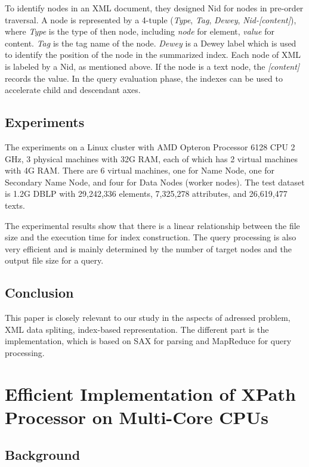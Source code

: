 \documentclass{paper}
\begin{document}
	To identify nodes in an XML document, 
	they designed Nid for nodes in pre-order traversal. A node is
	represented by a 4-tuple  (\emph{Type}, \emph{Tag}, \emph{Dewey}, 
	\emph{Nid-[content]}), where \emph{Type} is the type of then node, 
	including \emph{node} for element, 	\emph{value} for
	content. \emph{Tag} is the tag name of the node. \emph{Dewey} is a Dewey 
	label which is used to identify the position of the  node in the summarized
	index. Each node of XML is labeled by a Nid, as mentioned above.  If
	the node is a text node, the \emph{[content]} records the value. 
	In the query evaluation phase, the indexes can be used to accelerate 
	child and descendant axes.
	
	
	\subsection{Experiments} 
	
	The experiments on a Linux cluster with AMD Opteron Processor 6128 CPU
	2 GHz, 3 physical machines with 32G RAM, each of which has 2 virtual
	machines with 4G RAM. There are 6 virtual machines, one for Name Node,
	one for Secondary Name Node, and four for Data Nodes (worker nodes).
	The test dataset is 1.2G DBLP with 29,242,336 elements, 7,325,278
	attributes, and 26,619,477 texts.
	
	The experimental results show that there is a linear relationship
	between the file size and the execution time for index construction.
	The query processing is also very efficient and is mainly determined
	by the number of target nodes and the output file size for a query.
	
	\subsection{Conclusion}
	
	This paper is closely relevant to our study in the aspects of 
	adressed problem, XML data spliting, index-based representation.
	The different part is the implementation, which is based on SAX 
	for parsing and MapReduce for query processing.
	
	
	\section{Efficient Implementation of XPath Processor on Multi-Core CPUs} %
	
	\subsection{Background}
	
\end{document}
